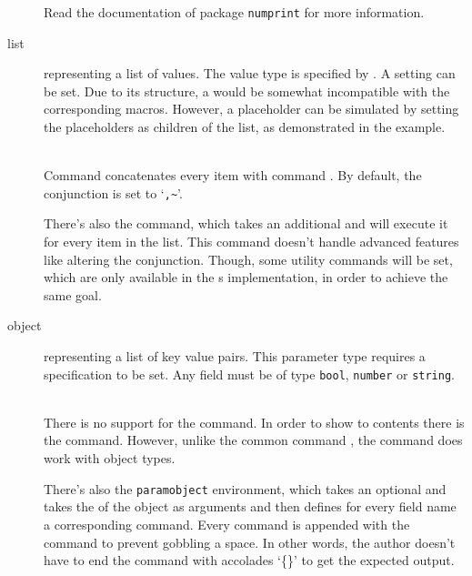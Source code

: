 \documentclass{ltxdoc}
\newcommand\showexample[5][15pt]{%
\begin{minipage}[t]{.5\linewidth - .5 \columnsep}%

\end{minipage}\hspace*{\columnsep}%
\begin{minipage}[t]{.5\linewidth - .5 \columnsep}%

\end{minipage}\\%
}
\begin{document}
\begin{description}
        Read the documentation of package \texttt{numprint} for more information.
        \item[list] representing a list of values.
        The value type is specified by .
        A  setting can be set.
        Due to its structure, a  would be somewhat incompatible with the corresponding macros.
        However, a placeholder can be simulated by setting the placeholders as children of the  list, as demonstrated in the example.\\
        \showexample{10}{10-15}{4}{4-6}
        \DescribeMacro{\param}
        Command \cmd{\param} concatenates every item with command \cmd{\paramlistconjunction}.
        \DescribeMacro{\paramlistconjunction}
        By default, the conjunction is set to `\texttt{,\textasciitilde}'.

        \DescribeMacro{\forlistitem}
        There's also the \cmd{\forlistitem} command, which takes an additional  and will execute it for every item in the list.
        This command doesn't handle advanced features like altering the conjunction.
        Though, some utility commands will be set, which are only available in the s implementation, in order to achieve the same goal.
        \item[object] representing a list of key value pairs.
        This parameter type requires a  specification to be set.
        Any field must be of type \texttt{bool}, \texttt{number} or \texttt{string}.\\
        \showexample{16}{16-24}{7}{7-9}
        There is no support for the \cmd{\param} command.
        \DescribeMacro{\paramfield}
        In order to show to contents there is the \cmd{\paramfield} command.
        However, unlike the common command \cmd{\param}, the command \cmd{\hasparam} does work with object types.

         There's also the \texttt{paramobject} environment, which takes an optional  and takes the  of the object as arguments and then defines for every field name a corresponding command.
        Every command is appended with the \cmd{\xspace} command to prevent gobbling a space.
        In other words, the author doesn't have to end the command with accolades `\{\}' to get the expected output.


\end{description}
\end{document}
